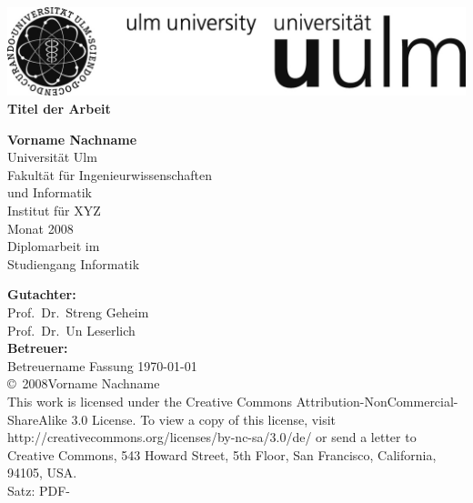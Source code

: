\documentclass[a4paper,10pt,bibtotoc,twoside,openright,pointlessnumbers,normalheadings
]{scrbook}
\newcommand{\fullname}{Vorname Nachname}
\newcommand{\titel}{Titel der Arbeit}
\newcommand{\jahr}{2008}
\newcommand{\gutachterA}{Prof.~Dr.~Streng Geheim}
\newcommand{\gutachterB}{Prof.~Dr.~Un Leserlich}
\newcommand{\betreuer}{Betreuername}
\begin{document}
\frontmatter

\thispagestyle{empty}
\vfill
\begin{flushright}
\includegraphics{images/unilogo_sw}
\vfill
{\bfseries \sffamily \huge \titel}\\[0.5em]
\vfill
\vfill
\begin{minipage}{60mm}
\textbf{\fullname}\\
Universität Ulm\\
Fakultät für Ingenieurwissenschaften\\
und Informatik\\
Institut für XYZ\\
Monat \jahr\\
Diplomarbeit im\\
Studiengang Informatik
\end{minipage}
\vfill
\end{flushright}

\clearpage
\thispagestyle{empty}
\vfill
{\large \bfseries Gutachter:}\\                     
\gutachterA\\
\gutachterB\\[2em]
{\large \bfseries Betreuer:}\\ 
\betreuer
\vfill
{ \small
  \flushleft
  Fassung \today \\
  \copyright~\jahr \fullname\\
This work is licensed under the Creative Commons Attribution-NonCommercial-ShareAlike 3.0 License. To view a copy of this license, visit http://creativecommons.org/licenses/by-nc-sa/3.0/de/ or send a letter to Creative Commons, 543 Howard Street, 5th Floor, San Francisco, California, 94105, USA. \\
  Satz: PDF-\LaTeXe
}


\tableofcontents

\mainmatter

\end{document}

